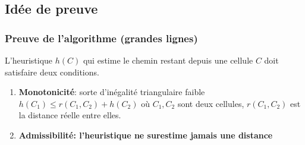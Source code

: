 \documentclass[]{beamer}
\begin{document}
\subsection{Idée de preuve}
\begin{frame}
  \frametitle{Preuve de l'algorithme (grandes lignes)}
  L'heuristique $h(C)$ qui estime le chemin restant depuis une cellule $C$
  doit satisfaire deux conditions.
  \begin{enumerate}
  \item<2-> \textbf{Monotonicité}: sorte d'inégalité triangulaire faible
    $h(C_1) \leq r(C_1,C_2) + h(C_2)$ où $C_1, C_2$ sont deux cellules,
    $r(C_1, C_2)$ est la distance réelle entre elles.
    \par\smallskip
  \item<3-> \textbf{Admissibilité: l'heuristique ne surestime jamais une distance}
    \par\smallskip
    \par\smallskip
  \end{enumerate}
\end{frame}
\end{document}
